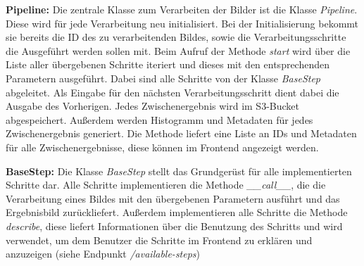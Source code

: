 \textbf{Pipeline:} Die zentrale Klasse zum Verarbeiten der Bilder ist die Klasse \textit{Pipeline}. Diese wird für jede Verarbeitung neu initialisiert. Bei der Initialisierung bekommt sie bereits die ID des zu verarbeitenden Bildes, sowie die Verarbeitungsschritte die Ausgeführt werden sollen mit. Beim Aufruf der Methode \textit{start} wird über die Liste aller übergebenen Schritte iteriert und dieses mit den entsprechenden Parametern ausgeführt. Dabei sind alle Schritte von der Klasse \textit{BaseStep} abgeleitet. Als Eingabe für den nächsten Verarbeitungsschritt dient dabei die Ausgabe des Vorherigen. Jedes Zwischenergebnis wird im S3-Bucket abgespeichert. Außerdem werden Histogramm und Metadaten für jedes Zwischenergebnis generiert. Die Methode liefert eine Liste an IDs und Metadaten für alle Zwischenergebnisse, diese können im Frontend angezeigt werden.

\textbf{BaseStep:} Die Klasse \textit{BaseStep} stellt das Grundgerüst für alle implementierten Schritte dar. Alle Schritte implementieren die Methode \textit{\_\_call\_\_}, die die Verarbeitung eines Bildes mit den übergebenen Parametern ausführt und das Ergebnisbild zurückliefert. Außerdem implementieren alle Schritte die Methode \textit{describe}, diese liefert Informationen über die Benutzung des Schritts und wird verwendet, um dem Benutzer die Schritte im Frontend zu erklären und anzuzeigen (siehe Endpunkt \textit{/available-steps})